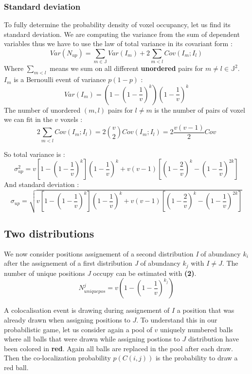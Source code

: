 \documentclass{article}
\begin{document}
\subsubsection{Standard deviation}
To fully determine the probability density of voxel occupancy, let us find its standard deviation. We are computing the variance from the sum of dependent variables
thus we have to use the law of total variance in its covariant form :
\[
Var(N_{up}) = \sum_{m \in \mathbb{J}} Var(I_m) +  2\sum_{m < l }Cov(I_m;I_l)
\]
Where $\sum_{m<l}$ means we sum on all different \textbf{unordered} pairs for $m \neq l \in \mathbb{J}^2$.\newline
$I_m$ is a Bernoulli event of variance $p(1-p)$ :
\[
Var(I_m) = (1-(1-\frac{1}{v})^k)(1-\frac{1}{v})^k
\]
The number of unordered $(m,l)$ pairs for $l \neq m$ is the number of pairs of voxel we can fit in the $v$ voxels : 
\[
    2\sum_{m < l }Cov(I_m;I_l) = 2\binom{v}{2}Cov(I_m;I_l) = 2\frac{v(v-1)}{2}Cov 
\]

So total variance is :
\[
    \sigma^2_{up} = v[1-(1-\frac{1}{v})^k](1-\frac{1}{v})^k + v(v-1)[(1-\frac{2}{v})^k - (1-\frac{1}{v})^{2k}]
\]
And standard deviation :
\begin{equation}
    \sigma_{up} = \sqrt{v[1-(1-\frac{1}{v})^k](1-\frac{1}{v})^k + v(v-1)[(1-\frac{2}{v})^k - (1-\frac{1}{v})^{2k}]}
\end{equation}



\newpage
\subsection{Two distributions}
We now consider positions assignement of a second distribution \textit{I} of abundancy $ k_i $ after the assignement of a first 
distribution \textit{J} of abundancy $ k_j $ with $ I \neq J $. The number of unique positions \textit{J} occupy can be estimated with
\textbf{(2)}.
\[
N^j_{uniquepos} = v(1-(1-\frac{1}{v})^{k_j})
\]

A colocalisation event is drawing during assignement of $I$ a position that was already drawn when assigning positions to $J$. To
understand this in our probabilistic game, let us consider again a pool of $v$ uniquely numbered balls where all balls that were 
drawn while assigning postions to $J$ distribution have been colored in \textbf{red}. Again all balls are replaced in the pool after
each draw. Then the co-localization probability $p(C(i,j))$ is the
probability to draw a red ball.
\end{document}
